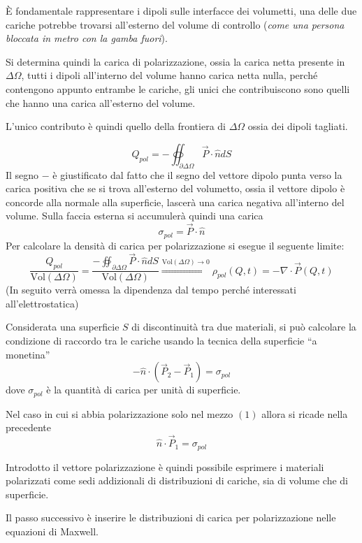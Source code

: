 
È fondamentale rappresentare i dipoli sulle interfacce
dei volumetti, una delle due cariche potrebbe trovarsi
all'esterno del volume di controllo (\textit{come una persona 
bloccata in metro con la gamba fuori}).

Si determina quindi la carica di polarizzazione, ossia la 
carica netta presente in $\Delta\Omega$, tutti i dipoli
all'interno del volume hanno carica netta nulla, perché
contengono appunto entrambe le cariche, gli unici che 
contribuiscono sono quelli che hanno una carica all'esterno 
del volume.

L'unico contributo è quindi quello della frontiera di
$\Delta\Omega$ ossia dei dipoli tagliati.

$$
Q_{pol} = -\oiint_{\partial\Delta\Omega} \vec{P}\cdot\hat{n}dS
$$
Il segno $-$ è giustificato dal fatto che il segno del vettore
dipolo punta verso la carica positiva che se si trova all'esterno
del volumetto, ossia il vettore dipolo è concorde alla normale
alla superficie, lascerà una carica negativa all'interno del 
volume.
Sulla faccia esterna si accumulerà quindi una carica 
$$
\sigma_{pol} = \vec{P}\cdot\hat{n}
$$
Per calcolare la densità di carica per polarizzazione si esegue il 
seguente limite:
$$
\frac{Q_{pol}}{\text{Vol}(\Delta\Omega)} = 
\frac{-\oiint_{\partial\Delta\Omega} \vec{P}\cdot\hat{n}dS}
{\text{Vol}(\Delta\Omega)} \stackrel{\text{Vol}(\Delta\Omega)\to 0}{\Rightarrow} \rho_{pol}(Q,t) = -\nabla\cdot\vec{P}(Q,t)
$$
(In seguito verrà omessa la dipendenza dal tempo perché interessati 
all'elettrostatica)

Considerata una superficie $S$ di discontinuità tra due materiali,
si può calcolare la condizione di raccordo tra le cariche usando 
la tecnica della superficie ``a monetina''
$$
-\hat{n}\cdot(\vec{P}_2-\vec{P}_1) = \sigma_{pol}
$$
dove $\sigma_{pol}$ è la quantità di carica per unità di superficie.

Nel caso in cui si abbia polarizzazione solo nel mezzo $(1)$
allora si ricade nella precedente
$$
\hat{n}\cdot\vec{P}_1 = \sigma_{pol}
$$

Introdotto il vettore polarizzazione è quindi possibile esprimere
i materiali polarizzati come sedi addizionali di distribuzioni di 
cariche, sia di volume che di superficie.

Il passo successivo è inserire le distribuzioni di carica per 
polarizzazione nelle equazioni di Maxwell.


